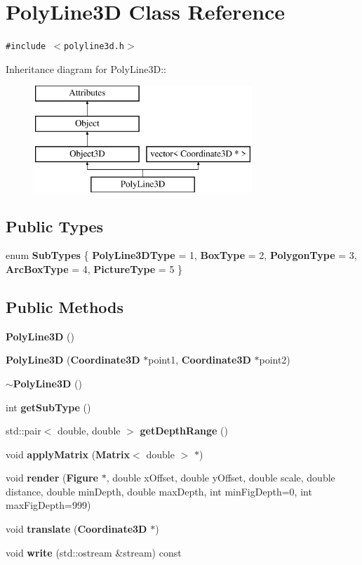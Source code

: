 \section{Poly\-Line3D Class Reference}
\label{classPolyLine3D}
{\tt \#include $<$polyline3d.h$>$}

Inheritance diagram for Poly\-Line3D::\begin{figure}[H]
\begin{center}
\leavevmode
\includegraphics[height=4cm]{classPolyLine3D}
\end{center}
\end{figure}
\subsection*{Public Types}
\begin{CompactItemize}
\item 
enum {\bf Sub\-Types} \{ {\bf Poly\-Line3DType} =   1, 
{\bf Box\-Type} =  2, 
{\bf Polygon\-Type} =  3, 
{\bf Arc\-Box\-Type} =  4, 
{\bf Picture\-Type} =  5
 \}
\end{CompactItemize}
\subsection*{Public Methods}
\begin{CompactItemize}
\item 
{\bf Poly\-Line3D} ()
\item 
{\bf Poly\-Line3D} ({\bf Coordinate3D} $\ast$point1, {\bf Coordinate3D} $\ast$point2)
\item 
{\bf $\sim$Poly\-Line3D} ()
\item 
int {\bf get\-Sub\-Type} ()
\item 
std::pair$<$ double, double $>$ {\bf get\-Depth\-Range} ()
\item 
void {\bf apply\-Matrix} ({\bf Matrix}$<$ double $>$ $\ast$)
\item 
void {\bf render} ({\bf Figure} $\ast$, double x\-Offset, double y\-Offset, double scale, double distance, double min\-Depth, double max\-Depth, int min\-Fig\-Depth=0, int max\-Fig\-Depth=999)
\item 
void {\bf translate} ({\bf Coordinate3D} $\ast$)
\item 
void {\bf write} (std::ostream \&stream) const
\end{CompactItemize}
